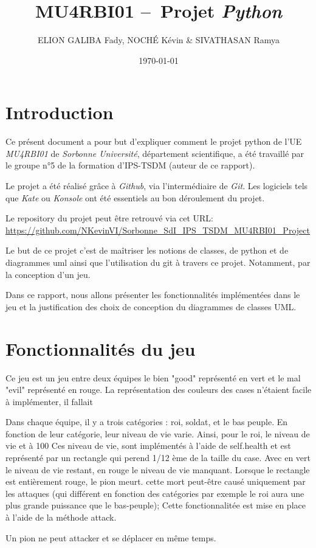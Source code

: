 \documentclass[11pt, a4paper, oneside, portrait]{article}
\author{E{\small{}LION} G{\small{}ALIBA} Fady, N{\small{}OCHÉ} Kévin \&{} S{\small{}IVATHASAN} Ramya}
\title{\textbf{MU4RBI01 --~Projet \emph{Python}}}
\date{\today}
\begin{document}
    \justifying
    \maketitle

    \section*{Introduction}
        Ce présent document a pour but d'expliquer comment le projet python de l'UE \emph{MU4RBI01} de \emph{Sorbonne Université}, département scientifique, a été travaillé par le groupe n°5 de la formation d'IPS-TSDM (auteur de ce rapport).

        Le projet a été réalisé grâce à \emph{Github}, via l'intermédiaire de \emph{Git}.
        Les logiciels tels que \emph{Kate} ou \emph{Konsole} ont été essentiels au bon déroulement du projet. %

        Le repository du projet peut être retrouvé via cet URL: \url{https://github.com/NKevinVI/Sorbonne\_SdI\_IPS\_TSDM\_MU4RBI01\_Project}

        Le but de ce projet c'est de maîtriser les notions de classes, de python et de diagrammes uml ainsi que l'utilisation du git à travers ce projet. Notamment, par la conception d'un jeu.
        
        Dans ce rapport, nous allons présenter les fonctionnalités implémentées dans le jeu et la justification des choix de conception du diagrammes de classes UML.

    \section*{Fonctionnalités du jeu}
         Ce jeu est un jeu entre deux équipes le bien "good" représenté en vert et le mal "evil" représenté en rouge. La représentation des couleurs des cases n'étaient facile à implémenter, il fallait 
        
        Dans chaque équipe, il y a trois catégories : roi, soldat, et le bas peuple. En fonction de leur catégorie, leur niveau de vie varie. Ainsi, pour le roi, le niveau de vie et à 100%
        Ces niveau de vie, sont implémentés à l'aide de self.health et est représenté par un rectangle qui perend 1/12 ème de la taille du case. Avec en vert le niveau de vie restant, en rouge le niveau de vie manquant. Lorsque le rectangle est entièrement rouge, le pion meurt. cette mort peut-être causé uniquement par les attaques (qui différent en fonction des catégories par exemple le roi aura une plus grande puissance que le bas-peuple); Cette fonctionnalitée est mise en place à l'aide de la méthode attack. 
        
        Un pion ne peut attacker et se déplacer en même temps.

\end{document}
